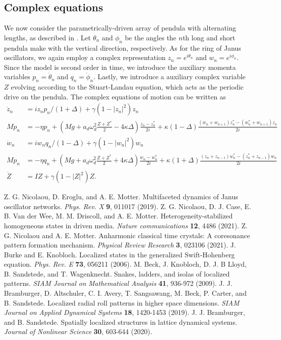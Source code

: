 \documentclass[aps,pre,amsmath,amssymb,floatfix,onecolumn,notitlepage,10pt]{revtex4-1}
\begin{document}
\subsection{Complex equations}
We now consider the parametrically-driven array of pendula with alternating lengths, as described in \cite{2021_Nicolaou_1,2021_Nicolaou_2}.  Let $\theta_n$ and $\phi_n$ be the angles the $n$th long and short pendula make with the vertical direction, respectively. As for the ring of Janus oscillators, we again employ a complex representation $z_n=e^{i\theta_n}$ and $w_n=e^{i\phi_n}$. Since the model is second order in time, we introduce the auxiliary momenta variables $p_n = \dot{\theta}_n$ and $q_n=\dot{\phi}_n$.  Lastly, we introduce a auxiliary complex variable $Z$ evolving according to the Stuart-Landau equation, which acts as the periodic drive on the pendula. The complex equations of motion can be written as
\begin{align}
\dot{z}_n&=iz_np_n/(1+\Delta)+\gamma(1-|z_n|^2)z_n \\
M\dot{p}_n&=-\eta p_n+(Mg+a_d\omega_d^2\frac{Z+Z^*}{2}-4\kappa\Delta)\frac{z_n-z_n^*}{2i} +\kappa(1-\Delta)\frac{(w_n+w_{n+1})z_n^*-(w_n^*+w_{n+1})z_n}{2i} \\
\dot{w}_n&=iw_nq_n/(1-\Delta)+\gamma(1-|w_n|^2)w_n \\
M\dot{p}_n&=-\eta q_n+(Mg+a_d\omega_d^2\frac{Z+Z^*}{2}+4\kappa\Delta)\frac{w_n-w_n^*}{2i} +\kappa(1+\Delta)\frac{(z_n+z_{n-1})w_n^*-(z_n^*+z_{n-1})w_n}{2i}\\
\dot{Z}&=IZ+\gamma(1-|Z|^2)Z.
\end{align}

\begin{thebibliography}{99}
 Z. G. Nicolaou, D. Eroglu, and A. E. Motter. Multifaceted dynamics of Janus oscillator networks. \textit{Phys. Rev. X} \textbf{9}, 011017 (2019).
 Z. G. Nicolaou, D. J. Case, E. B. Van der Wee, M. M. Driscoll, and A. E. Motter. Heterogeneity-stabilized homogeneous states in driven media. \textit{Nature communications} \textbf{12}, 4486 (2021).
 Z. G. Nicolaou and A. E. Motter. Anharmonic classical time crystals: A coresonance pattern formation mechanism. \textit{Physical Review Research} \textbf{3}, 023106 (2021).
 J. Burke and E. Knobloch. Localized states in the generalized Swift-Hohenberg equation. \textit{Phys. Rev. E} \textbf{73}, 056211 (2006).
 M. Beck, J. Knobloch, D. J. B Lloyd, B. Sandstede, and T. Wagenknecht. Snakes, ladders, and isolas of localized patterns. \textit{SIAM Journal on Mathematical Analysis} \textbf{41}, 936-972 (2009).
J. J. Bramburger, D. Altschuler, C. I. Avery, T. Sangsawang, M. Beck, P. Carter, and B. Sandstede. Localized radial roll patterns in higher space dimensions. \textit{SIAM Journal on Applied Dynamical Systems} \textbf{18}, 1420-1453 (2019).
J. J. Bramburger, and B. Sandstede. Spatially localized structures in lattice dynamical systems. \textit{Journal of Nonlinear Science} \textbf{30}, 603-644 (2020).
\end{thebibliography}
\end{document}
